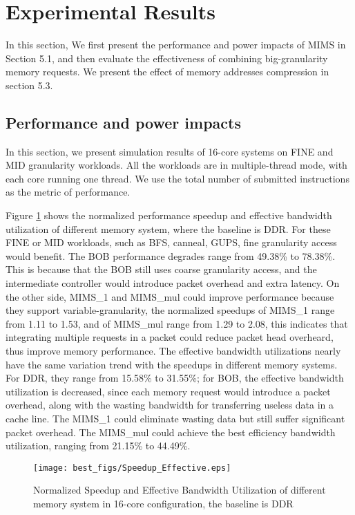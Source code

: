 \documentclass[pageno]{jpaper}
\begin{document}
\section {Experimental Results}

In this section,  We first present the performance and power impacts of MIMS in Section 5.1, and then evaluate the effectiveness of combining big-granularity memory requests. We present the effect of memory addresses compression in section 5.3.

\subsection {Performance and power impacts}

In this section, we present simulation results of 16-core systems on FINE and MID granularity workloads. All the workloads are in multiple-thread mode, with each core running one thread. We use the total number of submitted instructions as the metric of performance.

Figure \ref{Speed_Bandwidth} shows the normalized performance speedup and effective bandwidth utilization of different memory system, where the baseline is DDR. For these FINE or MID workloads, such as BFS, canneal, GUPS, fine granularity access would benefit. The BOB performance degrades range from 49.38\% to 78.38\%. This is because that the BOB still uses coarse granularity access, and the intermediate controller would introduce packet overhead and extra latency. On the other side, MIMS\_1 and MIMS\_mul could improve performance because they support variable-granularity, the normalized speedups of MIMS\_1 range from 1.11 to 1.53, and of MIMS\_mul range from 1.29 to 2.08, this indicates that integrating multiple requests in a packet could reduce packet head overheard, thus improve memory performance. The effective bandwidth utilizations nearly have the same variation trend with the speedups in different memory systems. For DDR, they range from 15.58\% to 31.55\%; for BOB, the effective bandwidth utilization is decreased, since each memory request would introduce a packet overhead, along with the wasting bandwidth for transferring useless data in a cache line. The MIMS\_1 could eliminate wasting data but still suffer significant packet overhead. The MIMS\_mul could achieve the best efficiency bandwidth utilization, ranging from 21.15\% to 44.49\%.

\begin{figure}
  \centering
  \texttt{[image: best\_figs/Speedup\_Effective.eps]}
  \caption{Normalized Speedup and Effective Bandwidth Utilization of different memory system in 16-core configuration, the baseline is DDR}
  \label{Speed_Bandwidth}
\end{figure}
\end{document}
